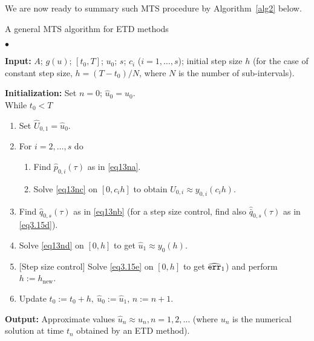 We are now ready to summary such MTS procedure by Algorithm~\ref{alg2} below.
\begin{algorithm}[ht!]
\caption{A general MTS algorithm for ETD methods}
\label{alg2}
\begin{list}{$\bullet $}{}  
\item \textbf{Input:}  $A$; $g(u)$; $[t_0, T]$; $u_0$; $s$; $c_i$ ($i=1,\ldots,s$); initial step size $h$ (for the case of constant step size, $h=(T-t_0)/N$, where $N$ is the number of sub-intervals).
\item \textbf{Initialization:}  Set $n=0$; $\hat{u}_0=u_0$.\\
While $t_0<T$
\begin{enumerate}
  \item Set $\widehat{U}_{0,1}=\hat{u}_0$. 
\item For $i=2,\ldots,s$ do
\begin{enumerate}
  \item Find  $\hat{p}_{0,i}(\tau)$ as in \eqref{eq13na}. 
  \item Solve \eqref{eq13nc} on $[0, c_i h]$ to obtain $\widehat{U}_{0,i}\approx y_{0,i}(c_i h)$.
\end{enumerate} 
 \item Find $\hat{q}_{0,s}(\tau)$ as in \eqref{eq13nb} (for a step size control, find also $\widehat{\bar{q}}_{0,s}(\tau)$ as in \eqref{eq3.15d}).
  \item Solve \eqref{eq13nd} on $[0, h]$ to get $\hat{u}_1\approx y_{0}(h).$
  \item {[}Step size control{]}  Solve \eqref{eq3.15e} on $[0, h]$  to get $\widehat{{\tt err}}_{1}$) and perform  $h:=h_{\text{new}}$.
  \item Update $ t_0:=t_0+h, \ \hat{u}_0:=\hat{u}_1$, $n:=n+1$. 
\end{enumerate}
\item \textbf{Output:} Approximate values $\hat{u}_n\approx u_n, n=1,2,\ldots$ (where
$u_n$ is the numerical solution at time $t_n$ obtained by an ETD method).
\end{list}
\end{algorithm}

